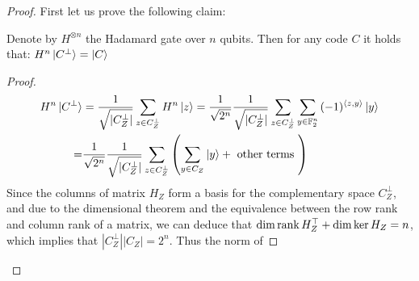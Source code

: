     \newcommand{\GZZZ}[1]{ \frac{1}{\sqrt{|C_{Z}^{\perp}|}} \sum_{z \in C_{Z}^{\perp}}{ #1 } } 
    \newcommand{\GZZZW}[2]{ \frac{1}{\sqrt{|C_{Z}^{\perp}|}} #2 \sum_{z \in C_{Z}^{\perp}}{ #1 } } 
    \newcommand{\GXXX}[1]{ \frac{1}{\sqrt{|C_{Z}|}} \sum_{z \in C_{Z}}{ #1 } } 
    \newcommand{\GXXXW}[2]{ \frac{1}{\sqrt{|C_{Z}|}} #2 \sum_{z \in C_{Z}}{ #1 } } 
    \newcommand{\GXXXV}[2]{ \sum_{#2 \in C_{Z}}{ #1 } } 
  \begin{proof}
    First let us prove the following claim: 
    \begin{claim}
      \label{claim:mapdual}
      Denote by $H^{\otimes n}$ the Hadamard gate over $n$ qubits. Then for any code $C$ it holds that: $  H^{n}\ket{C^{\perp}} = \ket{C} $
          \end{claim}
    \begin{proof}
      \begin{equation}
        \label{equ:dualspace} 
        \begin{split}
        H^{n}\ket{C^{\perp}} &= \GZZZ{ H^{n}\ket{z} } = \frac{1}{ \sqrt{ 2^{n}}} \GZZZ{ \sum_{y\in \mathbb{F}_{2}^{n}}{ (-1)^{\braket{z,y}}  \ket{y}}  }\\
        = & \frac{1}{ \sqrt{ 2^{n}}} \GZZZ{ \left( \GXXXV{ \ket{y} }{y} + \text{ other terms } \right) } 
        \end{split}
       \end{equation}
       Since the columns of matrix $H_{Z}$ form a basis for the complementary space $C_{Z}^{\perp}$, and due to the dimensional theorem and the equivalence between the row rank and column rank of a matrix, we can deduce that $\dim \operatorname{rank} H_{Z}^{\top} + \dim \ker H_{Z} = n$, which implies that $|C_{Z}^{\perp}||C_{Z}| = 2^{n}$. Thus the norm of  


\end{proof}
\end{proof}

